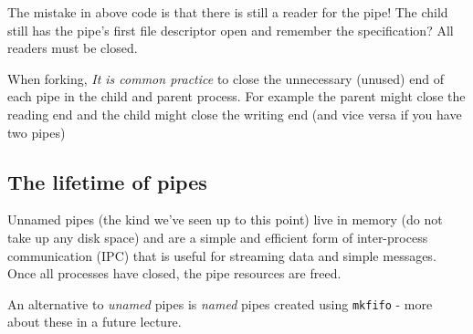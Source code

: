 \begin{Shaded}
\begin{Highlighting}[]

  
    \NormalTok{, }\NormalTok{, }\NormalTok{);}
\NormalTok{\}}

 
     \NormalTok{filedes[}\NormalTok{];}
    
     \NormalTok{) \{ }
        \NormalTok{close(filedes[}\NormalTok{]);}
    \NormalTok{\} } \NormalTok{\{}
        \NormalTok{write(filedes[}\NormalTok{], }\NormalTok{, }\NormalTok{);}
        \NormalTok{);}
        \NormalTok{write(filedes[}\NormalTok{], }\NormalTok{, }\NormalTok{);}
        \NormalTok{, }\NormalTok{, }\NormalTok{);}
    \NormalTok{\}}
     \NormalTok{;}
\NormalTok{\}}
\end{Highlighting}
\end{Shaded}

The mistake in above code is that there is still a reader for the pipe!
The child still has the pipe's first file descriptor open and remember
the specification? All readers must be closed.

When forking, \emph{It is common practice} to close the unnecessary
(unused) end of each pipe in the child and parent process. For example
the parent might close the reading end and the child might close the
writing end (and vice versa if you have two pipes)

\subsection{The lifetime of pipes}\label{the-lifetime-of-pipes}

Unnamed pipes (the kind we've seen up to this point) live in memory (do
not take up any disk space) and are a simple and efficient form of
inter-process communication (IPC) that is useful for streaming data and
simple messages. Once all processes have closed, the pipe resources are
freed.

An alternative to \emph{unamed} pipes is \emph{named} pipes created
using \texttt{mkfifo} - more about these in a future lecture.
